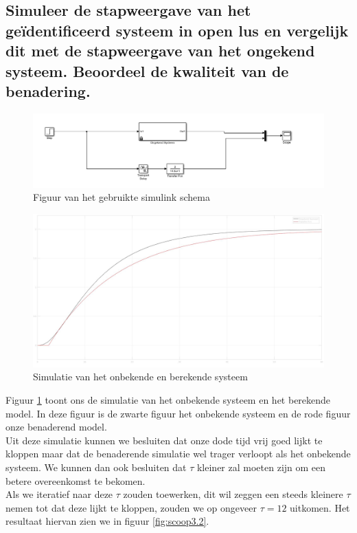 \documentclass[a4paper, 12pt]{article}
\begin{document}
\subsection{Simuleer de stapweergave van het geïdentificeerd systeem in open lus en vergelijk dit met de stapweergave van het ongekend systeem. Beoordeel de kwaliteit van de benadering.}

\begin{figure}[!h]
	\includegraphics[width=1\linewidth]{Labo1_3_systeem.jpg}
	\caption{Figuur van het gebruikte simulink schema}
\end{figure}

\begin{figure}[!h]
	\includegraphics[width=1\linewidth]{Labo1_3_scoop.jpg}
	\caption{Simulatie van het onbekende en berekende systeem}
	\label{fig:scoop3.1}
\end{figure}

\newpage

Figuur \ref{fig:scoop3.1} toont ons de simulatie van het onbekende systeem en het berekende model. In deze figuur is de zwarte figuur het onbekende systeem en de rode figuur onze benaderend model. \\
Uit deze simulatie kunnen we besluiten dat onze dode tijd vrij goed lijkt te kloppen maar dat de benaderende simulatie wel trager verloopt als het onbekende systeem. We kunnen dan ook besluiten dat $\tau$ kleiner zal moeten zijn om een betere overeenkomst te bekomen. \\
Als we iteratief naar deze $\tau$ zouden toewerken, dit wil zeggen een steeds kleinere $\tau$ nemen tot dat deze lijkt te kloppen, zouden we op ongeveer $\tau = 12$ uitkomen. Het resultaat hiervan zien we in figuur \ref{fig:scoop3.2}.
\end{document}
